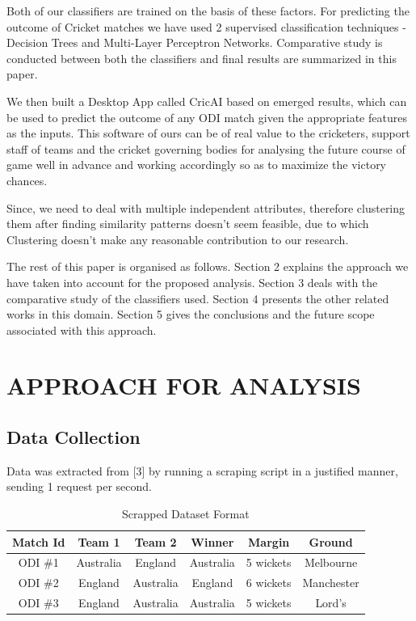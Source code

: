 \documentclass[a4paper, 10pt, conference]{IEEEtran}
\begin{document}
Both of our classifiers are trained on the basis of these factors. For predicting the outcome of Cricket matches we have used 2 supervised classification techniques - Decision Trees and Multi-Layer Perceptron Networks. Comparative study is conducted between both the classifiers and final results are summarized in this paper. 

We then built a Desktop App called CricAI based on emerged results, which can be used to predict the outcome of any ODI match given the appropriate features as the inputs. This software of ours can be of real value to the cricketers, support staff of teams and the cricket governing bodies for analysing the future course of game well in advance and working accordingly so as to maximize the victory chances.

Since, we need to deal with multiple independent attributes, therefore clustering them after finding similarity patterns doesn't seem feasible, due to which Clustering doesn't make any reasonable contribution to our research. 

The rest of this paper is organised as follows. Section 2 explains the approach we have taken into account for the proposed analysis. Section 3 deals with the comparative study of the classifiers used. Section 4 presents the other related works in this domain. Section 5 gives the conclusions and the future scope associated with this approach. \\

\section{APPROACH FOR ANALYSIS}

\subsection{Data Collection}

Data was extracted from [3] by running a scraping script in a justified manner, sending 1 request per second.
\begin{table}[h!]
  \begin{center}
    \caption{Scrapped Dataset Format}
    \label{tab:table1}
    \begin{tabular}{cccccc} 
      \textbf{Match Id} & \textbf{Team 1} & \textbf{Team 2} & \textbf{Winner} & \textbf{Margin} & \textbf{Ground}\\
      \hline
      ODI \#1 & Australia & England & Australia & 5 wickets & Melbourne\\
      ODI \#2 & England & Australia & England & 6 wickets & Manchester\\
      ODI \#3 & England & Australia & Australia & 5 wickets & Lord's\\
    \end{tabular}
  \end{center}
\end{table}
\end{document}
